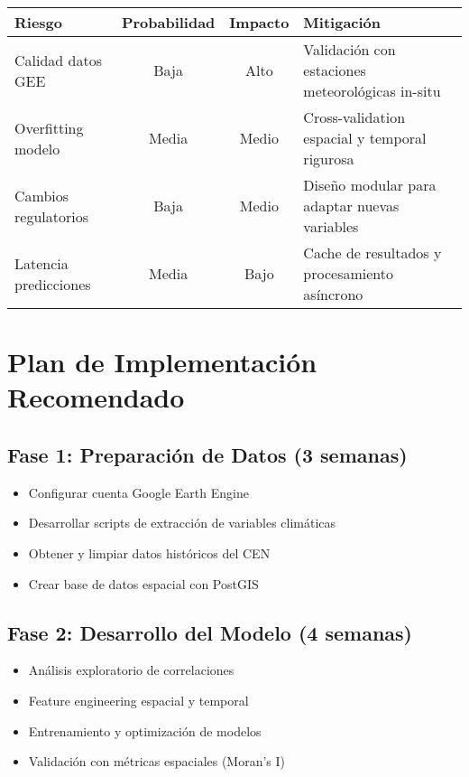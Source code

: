\documentclass[12pt,a4paper]{article}
\begin{document}
\begin{center}
\begin{tabular}{|p{3cm}|c|c|p{5cm}|}
\hline
\textbf{Riesgo} & \textbf{Probabilidad} & \textbf{Impacto} & \textbf{Mitigación} \\
\hline
Calidad datos GEE & Baja & Alto & Validación con estaciones meteorológicas in-situ \\
\hline
Overfitting modelo & Media & Medio & Cross-validation espacial y temporal rigurosa \\
\hline
Cambios regulatorios & Baja & Medio & Diseño modular para adaptar nuevas variables \\
\hline
Latencia predicciones & Media & Bajo & Cache de resultados y procesamiento asíncrono \\
\hline
\end{tabular}
\end{center}

\section{Plan de Implementación Recomendado}

\subsection{Fase 1: Preparación de Datos (3 semanas)}
\begin{itemize}
    \item Configurar cuenta Google Earth Engine
    \item Desarrollar scripts de extracción de variables climáticas
    \item Obtener y limpiar datos históricos del CEN
    \item Crear base de datos espacial con PostGIS
\end{itemize}

\subsection{Fase 2: Desarrollo del Modelo (4 semanas)}
\begin{itemize}
    \item Análisis exploratorio de correlaciones
    \item Feature engineering espacial y temporal
    \item Entrenamiento y optimización de modelos
    \item Validación con métricas espaciales (Moran's I)
\end{itemize}
\end{document}
